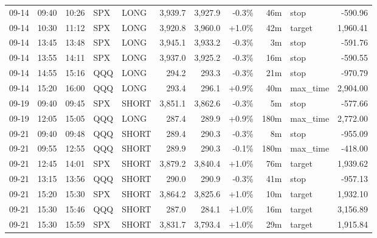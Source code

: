\documentclass[11pt,a4paper,twoside]{article}
\begin{document}
\begin{center}
\begin{longtable}{>{\color{txtmain}}l l l l l r r r r >{\color{txtmain}}l r}
09-14 & 09:40 & 10:26 & SPX & LONG & 3,939.7 & 3,927.9 & \textcolor{lossred}{-0.3\%} & 46m & stop & \textcolor{lossred}{-590.96} \\
09-14 & 10:30 & 11:12 & SPX & LONG & 3,920.8 & 3,960.0 & \textcolor{wingreen}{+1.0\%} & 42m & target & \textcolor{wingreen}{1,960.41} \\
09-14 & 13:45 & 13:48 & SPX & LONG & 3,945.1 & 3,933.2 & \textcolor{lossred}{-0.3\%} & 3m & stop & \textcolor{lossred}{-591.76} \\
09-14 & 13:55 & 14:11 & SPX & LONG & 3,937.0 & 3,925.2 & \textcolor{lossred}{-0.3\%} & 16m & stop & \textcolor{lossred}{-590.55} \\
09-14 & 14:55 & 15:16 & QQQ & LONG & 294.2 & 293.3 & \textcolor{lossred}{-0.3\%} & 21m & stop & \textcolor{lossred}{-970.79} \\
09-14 & 15:20 & 16:00 & QQQ & LONG & 293.4 & 296.1 & \textcolor{wingreen}{+0.9\%} & 40m & max\_time & \textcolor{wingreen}{2,904.00} \\
09-19 & 09:40 & 09:45 & SPX & SHORT & 3,851.1 & 3,862.6 & \textcolor{lossred}{-0.3\%} & 5m & stop & \textcolor{lossred}{-577.66} \\
09-19 & 12:05 & 15:05 & QQQ & LONG & 287.4 & 289.9 & \textcolor{wingreen}{+0.9\%} & 180m & max\_time & \textcolor{wingreen}{2,772.00} \\
09-21 & 09:40 & 09:48 & QQQ & SHORT & 289.4 & 290.3 & \textcolor{lossred}{-0.3\%} & 8m & stop & \textcolor{lossred}{-955.09} \\
09-21 & 09:55 & 12:55 & QQQ & SHORT & 289.9 & 290.3 & \textcolor{lossred}{-0.1\%} & 180m & max\_time & \textcolor{lossred}{-418.00} \\
09-21 & 12:45 & 14:01 & SPX & SHORT & 3,879.2 & 3,840.4 & \textcolor{wingreen}{+1.0\%} & 76m & target & \textcolor{wingreen}{1,939.62} \\
09-21 & 13:15 & 13:56 & QQQ & SHORT & 290.0 & 290.9 & \textcolor{lossred}{-0.3\%} & 41m & stop & \textcolor{lossred}{-957.13} \\
09-21 & 15:20 & 15:30 & SPX & SHORT & 3,864.2 & 3,825.6 & \textcolor{wingreen}{+1.0\%} & 10m & target & \textcolor{wingreen}{1,932.10} \\
09-21 & 15:30 & 15:46 & QQQ & SHORT & 287.0 & 284.1 & \textcolor{wingreen}{+1.0\%} & 16m & target & \textcolor{wingreen}{3,156.89} \\
09-21 & 15:30 & 15:59 & SPX & SHORT & 3,831.7 & 3,793.4 & \textcolor{wingreen}{+1.0\%} & 29m & target & \textcolor{wingreen}{1,915.84} \\

\end{longtable}
\end{center}
\end{document}
